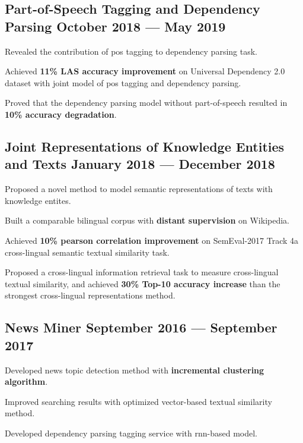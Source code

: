\subsection*{Part-of-Speech Tagging and Dependency Parsing \hfill October 2018 --- May 2019} 
    \begin{zitemize}
        \item Revealed the contribution of pos tagging to dependency parsing task.
        \item Achieved \textbf{11\% LAS accuracy improvement} on Universal Dependency 2.0 dataset with joint model of pos tagging and dependency parsing.
        \item Proved that the dependency parsing model without part-of-speech resulted in \textbf{10\% accuracy degradation}.
    \end{zitemize}


\subsection*{Joint Representations of Knowledge Entities and Texts \hfill January 2018 --- December 2018} 
    \begin{zitemize}
        \item Proposed a novel method to model semantic representations of texts with knowledge entites.
        \item Built a comparable bilingual corpus with \textbf{distant supervision} on Wikipedia.
        \item Achieved \textbf{10\% pearson correlation improvement} on SemEval-2017 Track 4a cross-lingual semantic textual similarity task.
        \item Proposed a cross-lingual information retrieval task to measure cross-lingual textual similarity, and achieved \textbf{30\% Top-10 accuracy increase} than the strongest cross-lingual representations method.
    \end{zitemize}


\subsection*{News Miner \hfill September 2016 --- September 2017} 
    \begin{zitemize}
        \item Developed news topic detection method with \textbf{incremental clustering algorithm}.
        \item Improved searching results with optimized vector-based textual similarity method.
        \item Developed dependency parsing tagging service with rnn-based model.
    \end{zitemize}
